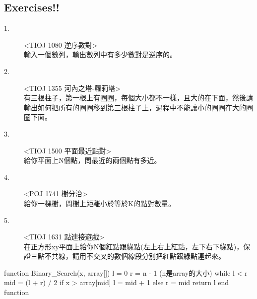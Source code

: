 \documentclass{article}
\begin{document}
\subsection{Exercises!!}
\begin{description}
\item[ 1.]<TIOJ 1080 逆序數對>\\
輸入一個數列，輸出數列中有多少數對是逆序的。
\item[ 2.]<TIOJ 1355 河內之塔-蘿莉塔>\\
有三根柱子，第一根上有圈圈，每個大小都不一樣，且大的在下面，然後請輸出如何把所有的圈圈移到第三根柱子上，過程中不能讓小的圈圈在大的圈圈下面。
\item[ 3.]<TIOJ 1500 平面最近點對>\\
給你平面上N個點，問最近的兩個點有多近。
\item[ 4.]<POJ 1741 樹分治>\\
給你一棵樹，問樹上距離小於等於K的點對數量。
\item[ 5.]<TIOJ 1631 點連接遊戲>\\
在正方形xy平面上給你N個紅點跟綠點(左上右上紅點，左下右下綠點)，保證三點不共線，請用不交叉的數個線段分別把紅點跟綠點連起來。
\end{description}


\begin{algorithm}[caption={Binary Search}, label={alg1}]
function Binary_Search(x, array[])
    l = 0
    r = n - 1 (n是array的大小)
    while l < r
        mid = (l + r) / 2
        if x > array[mid]
            l = mid + 1
        else
            r = mid
    return l
end function
\end{algorithm}
\end{document}
